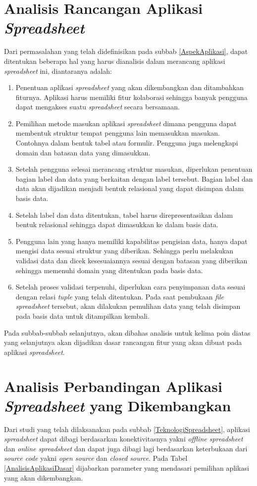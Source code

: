 \section{Analisis Rancangan Aplikasi \textit{Spreadsheet}}
Dari permasalahan yang telah didefinisikan pada subbab \ref{AspekAplikasi}, dapat ditentukan beberapa hal yang harus dianalisis dalam merancang aplikasi \textit{spreadsheet} ini, diantaranya adalah:
\begin{enumerate}
	\item Penentuan aplikasi \textit{spreadsheet} yang akan dikembangkan dan ditambahkan fiturnya. Aplikasi harus memiliki fitur kolaborasi sehingga banyak pengguna dapat mengakses suatu \textit{spreadsheet} secara bersamaan.  
	\item Pemilihan metode masukan aplikasi \textit{spreadsheet} dimana pengguna dapat membentuk struktur tempat pengguna lain memasukkan masukan. Contohnya dalam bentuk tabel atau formulir. Pengguna juga melengkapi domain dan batasan data yang dimasukkan.
	\item Setelah pengguna selesai merancang struktur masukan, diperlukan penentuan bagian label dan data yang berkaitan dengan label tersebut. Bagian label dan data akan dijadikan menjadi bentuk relasional yang dapat disimpan dalam basis data.
	\item Setelah label dan data ditentukan, tabel harus direpresentasikan dalam bentuk relasional sehingga dapat dimasukkan ke dalam basis data.
	\item Pengguna lain yang hanya memiliki kapabilitas pengisian data, hanya dapat mengisi data sesuai struktur yang diberikan. Sehingga perlu melakukan validasi data dan dicek kesesuaiannya sesuai dengan batasan yang diberikan sehingga memenuhi domain yang ditentukan pada basis data.
	\item Setelah proses validasi terpenuhi, diperlukan cara penyimpanan data sesuai dengan relasi \textit{tuple} yang telah ditentukan. Pada saat pembukaan \textit{file spreadsheet} tersebut, akan dilakukan pemulihan data yang telah disimpan pada basis data untuk ditampilkan kembali.
\end{enumerate}
Pada subbab-subbab selanjutnya, akan dibahas analisis untuk kelima poin diatas yang selanjutnya akan dijadikan dasar rancangan fitur yang akan dibuat pada aplikasi \textit{spreadsheet}.

\section{Analisis Perbandingan Aplikasi \textit{Spreadsheet} yang Dikembangkan}
Dari studi yang telah dilaksanakan pada subbab \ref{TeknologiSpreadsheet}, aplikasi \textit{spreadsheet} dapat dibagi berdasarkan konektivitasnya yakni \textit{offline spreadsheet} dan \textit{online spreadsheet} dan dapat juga dibagi lagi berdasarkan keterbukaan dari \textit{source code} yakni \textit{open source} dan \textit{closed source}. Pada Tabel \ref{AnalisisAplikasiDasar} dijabarkan parameter yang mendasari pemilihan aplikasi yang akan dikembangkan.

